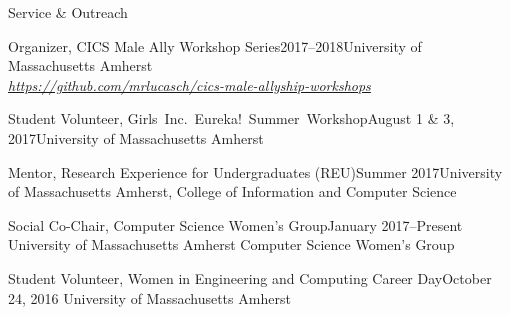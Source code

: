 \documentclass{resume} %
\begin{document}

\begin{rSection}{Service \& Outreach}

\begin{rrSubsection}{Organizer, CICS Male Ally Workshop Series}{2017--2018}{University of Massachusetts Amherst \\}
{\emph{\url{https://github.com/mrlucasch/cics-male-allyship-workshops}}}
\end{rrSubsection}


\begin{rrSubsection}{Student Volunteer, Girls~Inc.~Eureka!~Summer~Workshop}{August 1 \& 3, 2017}{University of Massachusetts Amherst}{}
\end{rrSubsection}

\begin{rrSubsection}{Mentor, Research Experience for Undergraduates (REU)}{Summer 2017}{University of Massachusetts Amherst, College of Information and Computer Science}{}
\end{rrSubsection}

\begin{rrSubsection}{Social Co-Chair,  Computer Science Women's Group}{January 2017--Present}
{University of Massachusetts Amherst Computer Science Women's Group}{}
\end{rrSubsection}

\begin{rrSubsection}{Student Volunteer, Women in Engineering and Computing Career Day}{October 24, 2016}
{University of Massachusetts Amherst \\
}{}
\end{rrSubsection}

\end{rSection}

\end{document}
